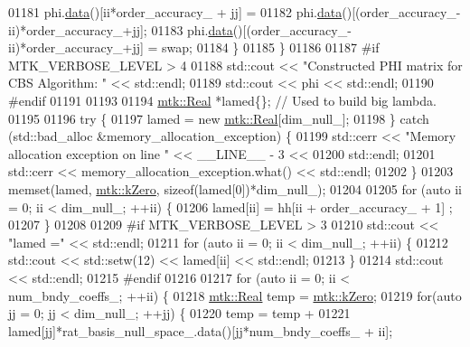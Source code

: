 \begin{DoxyCode}
{{01181         phi.\hyperlink{classmtk_1_1DenseMatrix_a0c33b8a9e01d157c61ddbdf807c25d84}{data}()[ii*order\_accuracy\_ + jj] =
01182           phi.\hyperlink{classmtk_1_1DenseMatrix_a0c33b8a9e01d157c61ddbdf807c25d84}{data}()[(order\_accuracy\_-ii)*order\_accuracy\_+jj];
01183         phi.\hyperlink{classmtk_1_1DenseMatrix_a0c33b8a9e01d157c61ddbdf807c25d84}{data}()[(order\_accuracy\_-ii)*order\_accuracy\_+jj] = swap;
01184       \}
01185     \}
01186 
01187 \textcolor{preprocessor}{    #if MTK\_VERBOSE\_LEVEL > 4}
01188     std::cout << \textcolor{stringliteral}{"Constructed PHI matrix for CBS Algorithm: "} << std::endl;
01189     std::cout << phi << std::endl;
01190 \textcolor{preprocessor}{    #endif}
01191 
01193 
01194     \hyperlink{group__c01-roots_gac080bbbf5cbb5502c9f00405f894857d}{mtk::Real} *lamed\{\};  \textcolor{comment}{// Used to build big lambda.}
01195 
01196     \textcolor{keywordflow}{try} \{
01197       lamed = \textcolor{keyword}{new} \hyperlink{group__c01-roots_gac080bbbf5cbb5502c9f00405f894857d}{mtk::Real}[dim\_null\_];
01198     \} \textcolor{keywordflow}{catch} (std::bad\_alloc &memory\_allocation\_exception) \{
01199       std::cerr << \textcolor{stringliteral}{"Memory allocation exception on line "} << \_\_LINE\_\_ - 3 <<
01200         std::endl;
01201       std::cerr << memory\_allocation\_exception.what() << std::endl;
01202     \}
01203     memset(lamed, \hyperlink{group__c01-roots_ga59a451a5fae30d59649bcda274fea271}{mtk::kZero}, \textcolor{keyword}{sizeof}(lamed[0])*dim\_null\_);
01204 
01205     \textcolor{keywordflow}{for} (\textcolor{keyword}{auto} ii = 0; ii < dim\_null\_; ++ii) \{
01206       lamed[ii] = hh[ii + order\_accuracy\_ + 1] ;
01207     \}
01208 
01209 \textcolor{preprocessor}{    #if MTK\_VERBOSE\_LEVEL > 3}
01210     std::cout << \textcolor{stringliteral}{"lamed ="} << std::endl;
01211     \textcolor{keywordflow}{for} (\textcolor{keyword}{auto} ii = 0; ii < dim\_null\_; ++ii) \{
01212       std::cout << std::setw(12) << lamed[ii] << std::endl;
01213     \}
01214     std::cout << std::endl;
01215 \textcolor{preprocessor}{    #endif}
01216 
01217     \textcolor{keywordflow}{for} (\textcolor{keyword}{auto} ii = 0; ii < num\_bndy\_coeffs\_; ++ii) \{
01218       \hyperlink{group__c01-roots_gac080bbbf5cbb5502c9f00405f894857d}{mtk::Real} temp = \hyperlink{group__c01-roots_ga59a451a5fae30d59649bcda274fea271}{mtk::kZero};
01219       \textcolor{keywordflow}{for}(\textcolor{keyword}{auto} jj = 0; jj < dim\_null\_; ++jj) \{
01220         temp = temp +
01221           lamed[jj]*rat\_basis\_null\_space\_.data()[jj*num\_bndy\_coeffs\_ + ii];
}}
\end{DoxyCode}
